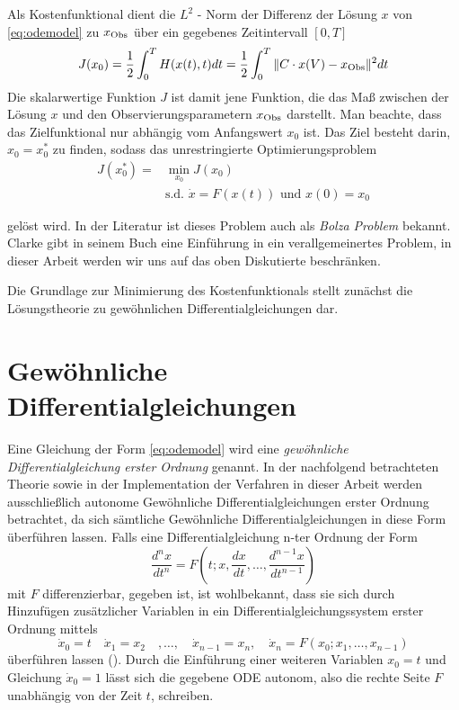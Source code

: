 Als Kostenfunktional dient die $L^2$ - Norm der Differenz der Lösung $x$ von \eqref{eq:odemodel} zu $x_{\text{Obs}}$ über ein gegebenes Zeitintervall $[0,T]$
\begin{equation}
\label{eq:costfunctional}
 J(x_0) = \frac{1}{2}\int_0^T H(x(t),t)dt= \frac{1}{2}\int_0^T \|C\cdot x(V)-x_{\text{Obs}}\|^2dt
\end{equation}
Die skalarwertige Funktion $J$ ist damit jene Funktion, die das Maß zwischen der Lösung $x$ und den Observierungsparametern $x_{\text{Obs}}$ darstellt.
Man beachte, dass das Zielfunktional nur abhängig vom Anfangswert $x_0$ ist. Das Ziel besteht darin, $x_0 = x_0^*$ zu finden, sodass das unrestringierte Optimierungsproblem
\begin{equation}
\label{eq:bolzaProblem}
\begin{aligned}
 J(x_0^*) =& \min_{x_0} J(x_0) \\
 &\text{s.d. } \dot x = F(x(t)) \text{ und } x(0) = x_0
\end{aligned}
\end{equation}

gelöst wird. 
In der Literatur ist dieses Problem auch als \textit{Bolza Problem} bekannt. Clarke gibt in seinem Buch \cite[S. 165 ff]{clarke1990optimization} eine Einführung in ein verallgemeinertes Problem, in dieser Arbeit werden wir uns auf das oben Diskutierte beschränken.

Die Grundlage zur Minimierung des Kostenfunktionals stellt zunächst die Lösungstheorie zu gewöhnlichen Differentialgleichungen dar.

\section{Gewöhnliche Differentialgleichungen}
Eine Gleichung der Form \eqref{eq:odemodel} wird eine \textit{gewöhnliche Differentialgleichung erster Ordnung} genannt. 
In der nachfolgend betrachteten Theorie sowie in der Implementation der Verfahren in dieser Arbeit werden ausschließlich autonome Gewöhnliche Differentialgleichungen erster Ordnung betrachtet, da sich sämtliche Gewöhnliche Differentialgleichungen in diese Form überführen lassen.
Falls eine Differentialgleichung n-ter Ordnung der Form 
\[
 \frac{d^n x}{dt^n}= F\left(t;x,\frac{dx}{dt},\ldots,\frac{d^{n-1} x}{dt^{n-1}}\right)
\]
mit $F$ differenzierbar, gegeben ist, ist wohlbekannt, dass sie sich durch Hinzufügen zusätzlicher Variablen in ein Differentialgleichungssystem erster Ordnung mittels
\[
 \dot x_0=t\quad \dot x_1 = x_2 \quad ,\ldots,\quad \dot x_{n-1} = x_n, \quad  \dot x_n = F(x_0;x_1,\ldots,x_{n-1})
\]
überführen lassen (\cite[S. 105]{arnold2001grundbegriffe}).
Durch die Einführung einer weiteren Variablen $x_0 = t$ und Gleichung $\dot x_0=1$ lässt sich die gegebene ODE autonom, also die rechte Seite $F$ unabhängig von der Zeit $t$, schreiben.
